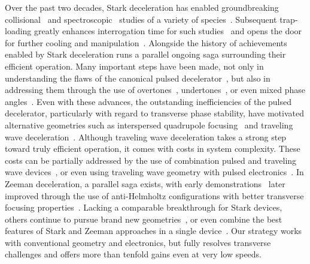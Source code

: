 \documentclass[%
 reprint,
 amsmath,amssymb,
 aps,
prl,
]{revtex4-1}
\begin{document}
Over the past two decades, Stark deceleration has enabled groundbreaking collisional~\cite{Sawyer2011,Kirste2012,Gao2018} and spectroscopic~\cite{Veldhoven2004,Hudson2006,Lev2006,Fast2018} studies of a variety of species~\cite{VanDeMeerakker2012}. 
Subsequent trap-loading greatly enhances interrogation time for such studies~\cite{Sawyer2008} and opens the door for further cooling and manipulation~\cite{Stuhl2012evap, Reens2017}. 
Alongside the history of achievements enabled by Stark deceleration runs a parallel ongoing saga surrounding their efficient operation. 
Many important steps have been made, not only in understanding the flaws of the canonical pulsed decelerator~\cite{VanDeMeerakker2006,Sawyer2008a}, but also in addressing them through the use of overtones~\cite{VanDeMeerakker2005a,Scharfenberg2009}, undertones~\cite{Zhang2016}, or even mixed phase angles~\cite{Parazzoli2009,Hou2013}. 
Even with these advances, the outstanding inefficiencies of the pulsed decelerator, particularly with regard to transverse phase stability, have motivated alternative geometries such as interspersed quadrupole focusing~\cite{Sawyer2008a} and traveling wave deceleration~\cite{Osterwalder2010,VandenBerg2014,Fabrikant2014}.
Although traveling wave deceleration takes a strong step toward truly efficient operation, it comes with costs in system complexity. 
These costs can be partially addressed by the use of combination pulsed and traveling wave devices~\cite{Quintero-Perez2013}, or even using traveling wave geometry with pulsed electronics~\cite{Hou2016,Shyur2017}. 
In Zeeman deceleration, a parallel saga exists, with early demonstrations~\cite{Vanhaecke2007,Narevicius2008} later improved through the use of anti-Helmholtz configurations with better transverse focusing properties~\cite{LavertOfir2011,Dulitz2014}.
Lacking a comparable breakthrough for Stark devices, others continue to pursue brand new geometries~\cite{Wang2016}, or even combine the best features of Stark and Zeeman approaches in a single device~\cite{Cremers2017,Plomp2019}.
Our strategy works with conventional geometry and electronics, but fully resolves transverse challenges and offers more than tenfold gains even at very low speeds.
\end{document}

